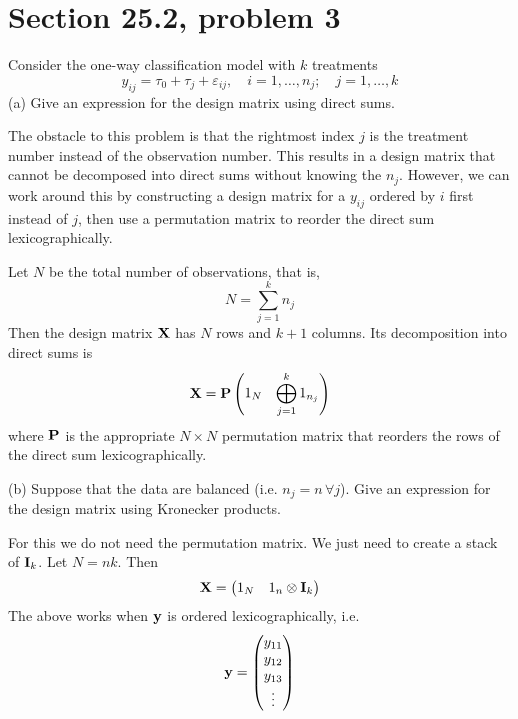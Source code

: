 \section{Section 25.2, problem 3}
Consider the one-way classification model with $k$ treatments
$$y_{ij}=\tau_0+\tau_j+\varepsilon_{ij},\quad
i=1,\ldots,n_j;\quad j=1,\ldots,k$$
(a) Give an expression for the design matrix using direct sums.

\bigskip
\noindent
The obstacle to this problem is that the rightmost index $j$ is
the treatment number instead of the observation number.
This results in a
design matrix that cannot be decomposed into direct sums without
knowing the $n_j$.
However, we can work around this by constructing a design matrix
for a $y_{ij}$ ordered by $i$ first instead of $j$, then use a permutation matrix to reorder the direct sum lexicographically.


\bigskip
\noindent
Let $N$ be the total number of observations, that is,
$$N=\sum_{j=1}^kn_j$$
Then the design matrix $\bf X$ has $N$ rows and $k+1$ columns.
Its decomposition into direct sums is
$${\bf X}={\bf P}\left(\begin{matrix}
1_N & \displaystyle{\bigoplus_{j=1}^k1_{n_j}}\end{matrix}\right)$$
where $\bf P$ is the appropriate $N\times N$ permutation matrix
that reorders the rows of the direct sum lexicographically.

\bigskip
\noindent
(b) Suppose that the data are balanced (i.e. $n_j=n\,\forall j$).
Give an expression for the design matrix using Kronecker products.

\bigskip
\noindent
For this we do not need the permutation matrix.
We just need to create a stack of ${\bf I}_k$.
Let $N=nk$. Then
$${\bf X}=\left(\begin{matrix}1_N & 1_n\otimes{\bf I}_k
\end{matrix}\right)$$
The above works when $\bf y$ is ordered lexicographically, i.e.
$${\bf y}=\left(\begin{matrix}
y_{11}\cr
y_{12}\cr
y_{13}\cr
\vdots
\end{matrix}\right)
$$
